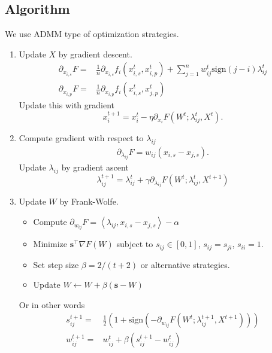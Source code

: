 \documentclass{article}
\begin{document}
\newpage
\appendix

\subsection{Algorithm}
We use ADMM type of optimization strategies.

\begin{enumerate}
  \item Update $X$ by gradient descent.
  \begin{align}
    \partial_{x_{i,s}} F =& \frac{1}{n}\partial_{x_{i,s}} f_i(x^t_{i,s},x^t_{i,p}) + \sum_{j=1}^n w^t_{ij} \text{sign}(j-i) \lambda^t_{ij}  \\
    \partial_{x_{i,p}} F =& \frac{1}{n}\partial_{x_{i,p}} f_i(x^t_{i,s},x^t_{j,p})
  \end{align}
  Update this with gradient
  \begin{equation}
    x_{i}^{t+1} = x_i^t - \eta \partial_{x_{i}} F(W^t;\lambda_{ij}^t, X^t).
  \end{equation}
  \item Compute gradient with respect to $\lambda_{ij}$
  \begin{align}
    \partial_{\lambda_{ij}} F = w_{ij} (x_{i,s} - x_{j,s}).
  \end{align}
  Update $\lambda_{ij}$ by gradient ascent
  \begin{equation}
    \lambda_{ij}^{t+1} = \lambda_{ij}^t + \gamma \partial_{\lambda_{ij}} F(W^t;\lambda_{ij}^t, X^{t+1})
  \end{equation}
  \item Update $W$ by Frank-Wolfe.
  \begin{itemize}
    \item Compute $\partial_{w_{ij}} F = \left<\lambda_{ij}, x_{i,s} - x_{j,s} \right> - \alpha$
    \item Minimize $\mathbf{s}^\top \nabla F(W)$ subject to $s_{ij} \in [0,1]$, $s_{ij}=s_{ji}$, $s_{ii}=1$.
    \item Set step size $\beta=2/(t+2)$ or alternative strategies.
    \item Update $W\leftarrow W + \beta(\mathbf{s} - W)$
  \end{itemize}
  Or in other words
  \begin{align}
    s_{ij}^{t+1} =& \tfrac{1}{2} \left(1+\text{sign}\left( - \partial_{w_{ij}} F(W^t; \lambda_{ij}^{t+1}, X^{t+1})\right) \right) \\
    w_{ij}^{t+1} =& w_{ij}^t + \beta(s_{ij}^{t+1} - w_{ij}^t)
  \end{align}
\end{enumerate}
\end{document}
